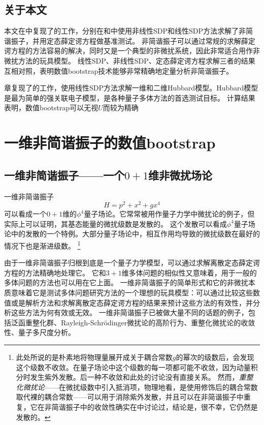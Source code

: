 \documentclass[oneside]{fduthesis}
\begin{document}
\section{关于本文}

本文在中复现了\parencite{han_matrix}的工作，分别在和中使用非线性SDP和线性SDP方法求解了非简谐振子，并用定态薛定谔方程做基准测试。
非简谐振子可以通过常规的求解薛定谔方程的方法容易的解决，同时又是一个典型的非微扰系统，因此非常适合用作非微扰方法的玩具模型。
线性SDP、非线性SDP、定态薛定谔方程求解三者的结果互相对照，表明数值bootstrap技术能够非常精确地定量分析非简谐振子。

章复现了\parencite{han_manybody}的工作，使用线性SDP方法求解一维和二维Hubbard模型。Hubbard模型是最为简单的强关联电子模型，是各种量子多体方法的首选测试目标。
计算结果表明，数值bootstrap可以无视$U$而较为精确

\chapter{一维非简谐振子的数值bootstrap}\label{chap:oscillator}

\section{一维非简谐振子——一个$0+1$维非微扰场论}

一维非简谐振子
\begin{equation}
    H = p^2 + x^2 + g x^4
\end{equation}
可以看成一个$0+1$维的$\phi^4$量子场论。它常常被用作量子力学中微扰论的例子，但实际上可以证明，其基态能量的微扰级数是发散的\cite{PhysRev.184.1231}。
这个发散可以看成$\phi^4$量子场论中的发散的一个特例。大部分量子场论中，相互作用均导致的微扰级数在最好的情况下也是渐进级数\cite{Jackiw_effective}。%
\footnote{此处所说的是朴素地将物理量展开成关于耦合常数$g$的幂次的级数后，会发现这个级数不收敛。在量子场论中这个级数的每一项都可能不收敛，因为动量积分时发生紫外发散。后一种不收敛和此处的讨论没有直接关系。
然而，\emph{重整化微扰论}——在微扰级数中引入抵消项，物理地看，是使用修饰后的耦合常数取代裸的耦合常数——可以用于消除紫外发散，并且可以在非简谐振子中重复，它在非简谐振子中的收敛性确实在\parencite{Bender-1970uz}中讨论过，结论是，很不幸，它仍然是发散的。}

由于一维非简谐振子归根到底是一个量子力学模型，可以通过求解离散定态薛定谔方程的方法精确地处理它。
它和$3+1$维多体问题的相似性又意味着，用于一般的多体问题的方法也可以用在它上面。
一维非简谐振子的简单形式和它的非微扰本质意味着它是测试多体问题研究方法的一个理想的玩具模型：可以通过比较这些数值或是解析方法和求解离散定态薛定谔方程的结果来预计这些方法的有效性，并分析这些方法为何有效或无效。
一维非简谐振子已被做大量不同的话题的例子，包括泛函重整化群\cite{Nagy-2010fv}、Rayleigh-Schrödinger微扰论的高阶行为\cite{bender199041}、重整化微扰论的收敛性\cite{Bender-1970uz}、量子多尺度分析\cite{Bender_1996}。
\end{document}
